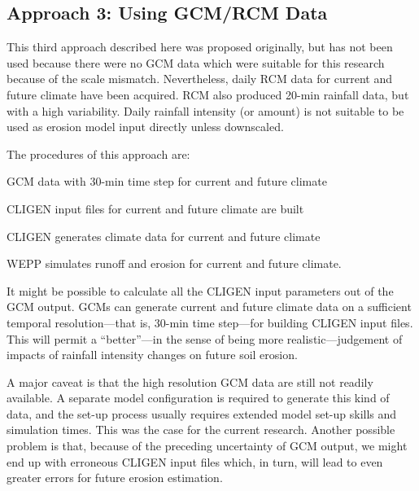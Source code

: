 \subsection{Approach 3: Using GCM/RCM Data}
\label{sec:MethodThree}

This third approach described here was proposed originally, but has not been
used
because there were no GCM data which were suitable for this research because of
the scale mismatch.
Nevertheless, daily RCM data for current and future climate have been acquired.
RCM also produced 20-min rainfall data, but with a high variability. Daily
rainfall intensity (or amount) is not suitable to be used as erosion model input
directly unless downscaled.

The procedures of this approach are:
\begin{enumerate*}
  \item GCM data with 30-min time step for current and future climate
  \item CLIGEN input files for current and future climate are built
  \item CLIGEN generates climate data for current and future climate
  \item WEPP simulates runoff and erosion for current and future climate.
\end{enumerate*}

It might be possible to calculate all the CLIGEN input parameters out of the GCM
output. GCMs can generate current and future climate data on a
sufficient temporal
resolution---that is, 30-min time step---for building CLIGEN input files.
This will permit a ``better''---in the sense of being more realistic---judgement
of impacts of rainfall intensity changes on future soil erosion.

A major caveat is that the high resolution GCM data are still not readily
available. A separate model configuration is required to generate this
kind of data, and the set-up process usually requires extended model set-up
skills and simulation times. This was the case for the current research.
Another possible problem is that, because of the preceding uncertainty of GCM
output, we might end up with erroneous CLIGEN input files which, in turn, will
lead to even greater errors for future erosion estimation.

